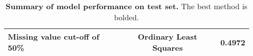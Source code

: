 \documentclass{article}\usepackage[]{graphicx}\usepackage[]{color}
\begin{document}
\begin{table}[ht]
\begin{tabular}{@{}|l|c|c|@{}}
Missing value cut-off of 50\% & Ordinary Least Squares & 0.4972 \\
                                                                                                                                                                                                                                                                                                                                                                                                                                                                                                                                                                                                \hline
                                                                                                                                                                                                                                                                                                                                                                                                                                                                                                                                                                                                \end{tabular}
                                                                                                                                                                                                                                                                                                                                                                                                                                                                                                                                                                                                \caption{\textbf{Summary of model performance on test set.} The best method is bolded.}
                                                                                                                                                                                                                                                                                                                                                                                                                                                                                                                                                                                                \label{tab-results}
                                                                                                                                                                                                                                                                                                                                                                                                                                                                                                                                                                                                \end{table}
\end{document}
